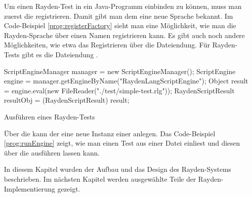 \SuperPar
Um einen Rayden-Test in ein Java-Programm einbinden zu können, muss man zuerst die  registrieren. Damit gibt man dem  eine neue Sprache bekannt. Im Code-Beispiel \ref{prog:registerFactory} sieht man eine Möglichkeit, wie man die Rayden-Sprache über einen Namen registrieren kann. Es gibt auch noch andere Möglichkeiten, wie etwa das Registrieren über die Dateiendung. Für Rayden-Tests gibt es die Dateiendung .

\begin{program}
\begin{JavaCode}
ScriptEngineManager manager = new ScriptEngineManager();
ScriptEngine engine = manager.getEngineByName("RaydenLangScriptEngine");
Object result =  engine.eval(new FileReader("./test/simple-test.rlg"));
RaydenScriptResult resultObj = (RaydenScriptResult) result;
\end{JavaCode}
\caption{Ausführen eines Rayden-Tests}
\label{prog:runEngine}
\end{program}

\SuperPar
Über die  kann der  eine neue Instanz einer  anlegen. Das Code-Beispiel \ref{prog:runEngine} zeigt, wie man einen Test aus einer Datei einliest und diesen über die  ausführen lassen kann.

\SuperPar
In diesem Kapitel wurden der Aufbau und das Design des Rayden-Systems beschrieben. Im nächsten Kapitel werden ausgewählte Teile der Rayden-Implementierung gezeigt.


